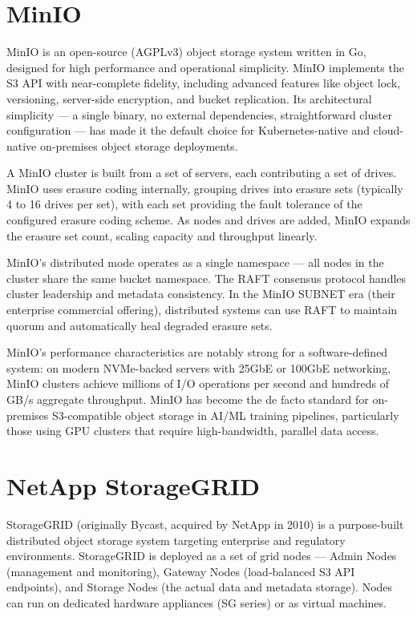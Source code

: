 \section{MinIO}
MinIO is an open-source (AGPLv3) object storage system written in Go, designed for high performance and operational simplicity. MinIO implements the S3 API with near-complete fidelity, including advanced features like object lock, versioning, server-side encryption, and bucket replication. Its architectural simplicity --- a single binary, no external dependencies, straightforward cluster configuration --- has made it the default choice for Kubernetes-native and cloud-native on-premises object storage deployments.

A MinIO cluster is built from a set of servers, each contributing a set of drives. MinIO uses erasure coding internally, grouping drives into erasure sets (typically 4 to 16 drives per set), with each set providing the fault tolerance of the configured erasure coding scheme. As nodes and drives are added, MinIO expands the erasure set count, scaling capacity and throughput linearly.

MinIO's distributed mode operates as a single namespace --- all nodes in the cluster share the same bucket namespace. The RAFT consensus protocol handles cluster leadership and metadata consistency. In the MinIO SUBNET era (their enterprise commercial offering), distributed systems can use RAFT to maintain quorum and automatically heal degraded erasure sets.

MinIO's performance characteristics are notably strong for a software-defined system: on modern NVMe-backed servers with 25GbE or 100GbE networking, MinIO clusters achieve millions of I/O operations per second and hundreds of GB/s aggregate throughput. MinIO has become the de facto standard for on-premises S3-compatible object storage in AI/ML training pipelines, particularly those using GPU clusters that require high-bandwidth, parallel data access.

\section{NetApp StorageGRID}
StorageGRID (originally Bycast, acquired by NetApp in 2010) is a purpose-built distributed object storage system targeting enterprise and regulatory environments. StorageGRID is deployed as a set of grid nodes --- Admin Nodes (management and monitoring), Gateway Nodes (load-balanced S3 API endpoints), and Storage Nodes (the actual data and metadata storage). Nodes can run on dedicated hardware appliances (SG series) or as virtual machines.

